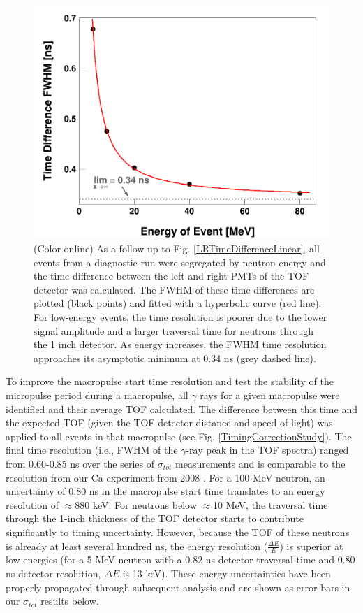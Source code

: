 \documentclass[twocolumn,secnumarabic,amssymb, nobibnotes, aps, prl,
superscriptaddress, nobalancelastpage]{revtex4}
\newcommand{\tots}{\ensuremath{\sigma_{tot}}\,\,}
\begin{document}
\begin{figure}
    \includegraphics[scale=0.3]{figures/DifferenceThresholdsFit.png}
    \caption{(Color online) As a follow-up to Fig. \ref{LRTimeDifferenceLinear},
        all events from a diagnostic run were segregated by neutron energy and the
        time difference between the left and right PMTs of the TOF detector
        was calculated. The FWHM of these time differences are plotted (black
        points) and fitted with a hyperbolic curve (red line). For low-energy
        events, the time resolution is poorer due to the lower signal amplitude and
        a larger traversal time for neutrons through the 1 inch detector. As energy
        increases, the FWHM time resolution approaches its asymptotic minimum at 0.34
    ns (grey dashed line).}
    \label{DifferenceThresholdsFit}
\end{figure}


To improve the macropulse start time resolution and test the stability of the
micropulse period during a macropulse, all $\gamma$ rays for a given macropulse
were identified and their average TOF calculated. The difference between this
time and the expected TOF (given the TOF detector distance and speed of light)
was applied to all events in that macropulse (see Fig.
\ref{TimingCorrectionStudy}). The final time resolution (i.e., FWHM of the
$\gamma$-ray peak in the TOF spectra) ranged from 0.60-0.85 ns over the series of
\tots measurements and is comparable to the resolution from our Ca experiment
from 2008 \cite{Shane2010}. For a 100-MeV neutron, an uncertainty of 0.80 ns in
the macropulse start time translates to an energy resolution of $\approx$880
keV. For neutrons below $\approx$10 MeV, the traversal time through
the 1-inch thickness of the TOF detector starts to contribute significantly
to timing uncertainty. However, because the TOF of these neutrons is already at
least several hundred ns, the energy resolution ($\frac{\Delta E}{E}$) is
superior at low energies (for a 5 MeV neutron with a 0.82 ns detector-traversal time and
0.80 ns detector resolution, $\Delta E$ is 13 keV). These energy uncertainties
have been properly propagated through subsequent analysis and are shown as error bars in our 
\tots results below.
\end{document}
